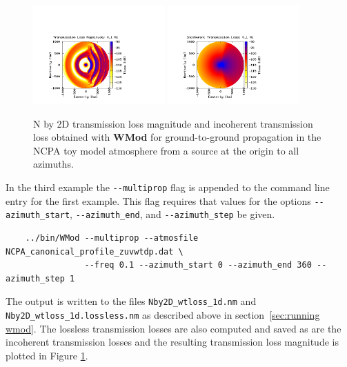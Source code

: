 \begin{figure}[h]
\begin{center}
\includegraphics[width=0.45\textwidth]{figs/wmod_ex3}
\includegraphics[width=0.45\textwidth]{figs/wmod_ex3_inco}
\end{center}
\caption{N by 2D transmission loss magnitude and incoherent transmission loss obtained with {\bf WMod} for ground-to-ground propagation in the NCPA toy model atmosphere from a source at the origin to all azimuths.}
\label{fig: wmod Nby2D tl}
\end{figure}

In the third example the \verb+--multiprop+ flag is appended to the command line entry for the first example. This flag requires that values for the options \verb+--azimuth_start+, \verb+--azimuth_end+, and \verb+--azimuth_step+ be given. 
\begin{verbatim} 
    ../bin/WMod --multiprop --atmosfile NCPA_canonical_profile_zuvwtdp.dat \
                --freq 0.1 --azimuth_start 0 --azimuth_end 360 --azimuth_step 1
\end{verbatim}
The output is written to the files \verb+Nby2D_wtloss_1d.nm+ and \verb+Nby2D_wtloss_1d.lossless.nm+ as described above in section~\ref{sec:running wmod}. The lossless transmission losses are also computed and saved as are the incoherent transmission losses and the resulting transmission loss magnitude is plotted in Figure \ref{fig: wmod Nby2D tl}. 
